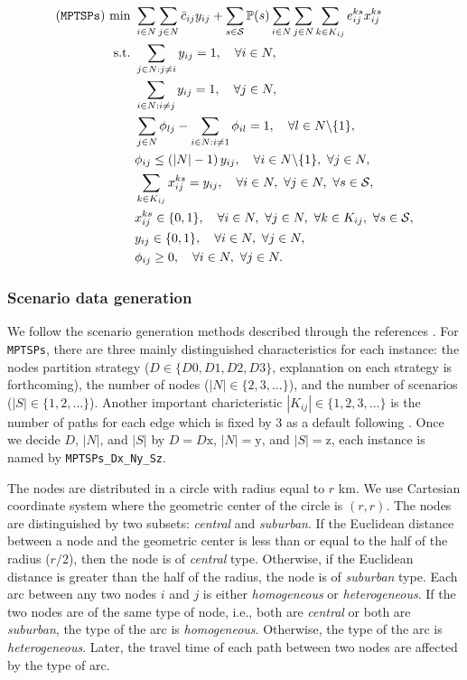 \begin{subequations}
\begin{align}
(\texttt{MPTSPs})\ \textrm{min}\ &\sum_{i\in N}\sum_{j\in N}\bar{c}_{ij}y_{ij}+\sum_{s\in \mathcal{S}}\PP(s)\sum_{i\in N}\sum_{j\in N}\sum_{k\in K_{ij}}e_{ij}^{ks}x_{ij}^{ks} \\
\textrm{s.t.}\ &\sum_{j\in N:j\neq i}y_{ij}=1,\quad\forall i\in N,\\
&\sum_{i\in N:i\neq j}y_{ij}=1,\quad\forall j\in N,\\
&\sum_{j\in N}\phi_{lj}-\sum_{i\in N: i\neq 1}\phi_{il}=1,\quad\forall l\in N\backslash\{1\},\\
&\phi_{ij}\le \left(|N|-1\right)y_{ij},\quad\forall i\in N\backslash\{1\},\ \forall j\in N,\\
&\sum_{k\in K_{ij}}x_{ij}^{ks}=y_{ij},\quad\forall i\in N,\ \forall j\in N,\ \forall s\in \mathcal{S}, \\
&x_{ij}^{ks}\in\{0,1\},\quad\forall i\in N,\ \forall j\in N,\ \forall k\in K_{ij},\ \forall s\in \mathcal{S},\\
&y_{ij}\in \{0,1\},\quad \forall i\in N,\ \forall j\in N,\\
&\phi_{ij} \ge 0, \quad \forall i\in N,\ \forall j\in N.
\end{align}
\end{subequations}

\subsubsection{Scenario data generation}
We follow the scenario generation methods described through the references \cite{journal:MPT2014,journal:PGM2017,journal:TPP2017}. For \texttt{MPTSPs}, there are three mainly distinguished characteristics for each instance: the nodes partition strategy ($D\in\{D0,D1,D2,D3\}$, explanation on each strategy is forthcoming), the number of nodes ($|N|\in\{2,3,\ldots\}$), and the number of scenarios ($|S|\in\{1,2,\ldots\}$). Another important charicteristic $|K_{ij}|\in\{1,2,3,\ldots\}$ is the number of paths for each edge which is fixed by 3 as a default following \cite{journal:TPP2017}. Once we decide $D$, $|N|$, and $|S|$ by $D=D\textrm{x}$, $|N|=\textrm{y}$, and $|S|=\textrm{z}$, each instance is named by \texttt{MPTSPs\_Dx\_Ny\_Sz}.

The nodes are distributed in a circle with radius equal to $r$ km. We use Cartesian coordinate system where the geometric center of the circle is $(r,r)$. The nodes are distinguished by two subsets: \textit{central} and \textit{suburban}. If the Euclidean distance between a node and the geometric center is less than or equal to the half of the radius ($r/2$), then the node is of \textit{central} type. Otherwise, if the Euclidean distance is greater than the half of the radius, the node is of \textit{suburban} type. Each arc between any two nodes $i$ and $j$ is either \textit{homogeneous} or \textit{heterogeneous}. If the two nodes are of the same type of node, i.e., both are \textit{central} or both are \textit{suburban}, the type of the arc is \textit{homogeneous}. Otherwise, the type of the arc is \textit{heterogeneous}. Later, the travel time of each path between two nodes are affected by the type of arc. 

